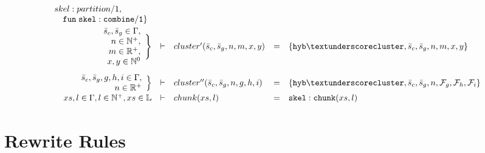 \documentclass{article}
\begin{document}
\[\begin{array}{rclcl}
\begin{array}{l}
{                                                           skel:partition/1},\; \\
                                                           \quad \mathtt{fun\; skel:combine/1}\}
                                                         \end{array} \\[.8em]
    \begin{array}{r}
      \bar{s}_c, \bar{s}_g \in \Gamma, \\
      n \in \mathbb{N}^{+}, \\
      m \in \mathbb{R}^{+}, \\
      x,y \in \mathbb{N}^{0}
    \end{array} \Bigg\} & \vdash & cluster'(\bar{s}_c, \bar{s}_g, n,
                               m, x, y) & = & \{\mathtt{hyb\textunderscore
                                              cluster}, \bar{s}_c, \bar{s}_g, n,
                                              m, x, y\} \\[2.5em]
    \begin{array}{r}
      \bar{s}_c, \bar{s}_g, g, h, i \in \Gamma, \\
      n \in \mathbb{R}^{+}
    \end{array} \Big\} & \vdash & cluster''(\bar{s}_c, \bar{s}_g, n,
                              g, h, i) & = & \{\mathtt{hyb\textunderscore cluster}, \bar{s}_c, \bar{s}_g, n,
                                               \mathcal{F}_g, \mathcal{F}_h,
                                             \mathcal{F}_i\} \\
    xs, l \in \Gamma, l \in \mathbb{N}^{+}, xs \in \mathbb{L} & \vdash & chunk(xs, l) & = & \mathtt{skel:chunk}(xs, l) \\
  \end{array}
\]

\section{Rewrite Rules}
\end{document}
